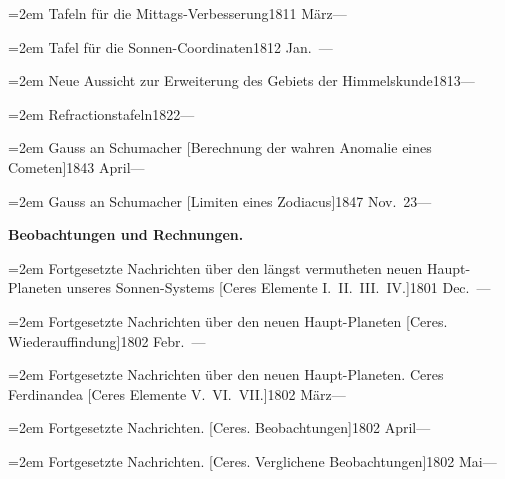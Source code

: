 \documentclass[12pt,a4paper]{article}
\begin{document}
{{\vspace{0.5mm}
\noindent\hangindent=2em
Tafeln f\"ur die Mittags-Verbesserung\hfill 1811 M\"arz\quad ---

\vspace{0.5mm}
\noindent\hangindent=2em
Tafel f\"ur die Sonnen-Coordinaten\hfill 1812 Jan.\ ---

\vspace{0.5mm}
\noindent\hangindent=2em
Neue Aussicht zur Erweiterung des Gebiets der Himmelskunde\hfill 1813\quad ---

\vspace{0.5mm}
\noindent\hangindent=2em
Refractionstafeln\hfill 1822\quad ---

\vspace{0.5mm}
\noindent\hangindent=2em
Gauss an Schumacher [Berechnung der wahren Anomalie eines Cometen]\hfill 1843 April\quad ---

\vspace{0.5mm}
\noindent\hangindent=2em
Gauss an Schumacher [Limiten eines Zodiacus]\hfill 1847 Nov.\ 23\quad ---

\vspace{2mm}
\noindent\textbf{Beobachtungen und Rechnungen.}

\vspace{1mm}
\noindent\hangindent=2em
Fortgesetzte Nachrichten \"uber den l\"angst vermutheten neuen Haupt-Planeten unseres Sonnen-Systems [Ceres Elemente I.\ II.\ III.\ IV.]\hfill 1801 Dec.\ ---

\vspace{0.5mm}
\noindent\hangindent=2em
Fortgesetzte Nachrichten \"uber den neuen Haupt-Planeten [Ceres. Wiederauffindung]\hfill 1802 Febr.\ ---

\vspace{0.5mm}
\noindent\hangindent=2em
Fortgesetzte Nachrichten \"uber den neuen Haupt-Planeten. Ceres Ferdinandea [Ceres Elemente V.\ VI.\ VII.]\hfill 1802 M\"arz\quad ---

\vspace{0.5mm}
\noindent\hangindent=2em
Fortgesetzte Nachrichten. [Ceres. Beobachtungen]\hfill 1802 April\quad ---

\vspace{0.5mm}
\noindent\hangindent=2em
Fortgesetzte Nachrichten. [Ceres. Verglichene Beobachtungen]\hfill 1802 Mai\quad ---

}}
\end{document}
